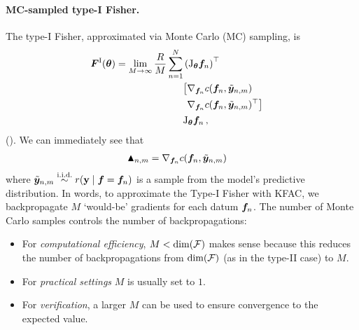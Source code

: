 \paragraph{MC-sampled type-I Fisher.}
The type-I Fisher, approximated via Monte Carlo (MC) sampling, is
\begin{align*}
  &\begin{aligned}
    {\bm{F}}^{\text{I}}({\bm{\theta}}) = \lim_{M \to \infty} \frac{R}{M} \sum_{n=1}^N
    &\left( \mathrm{J}_{{\bm{\theta}}} {\bm{f}}_n\right)^{\top} \\
    &
      \begin{aligned}
        \big[
        &\nabla_{{\bm{f}}_n} c({\bm{f}}_n, \tilde{{\bm{y}}}_{n,m}) \\
        &\nabla_{{\bm{f}}_n} c({\bm{f}}_n, \tilde{{\bm{y}}}_{n,m})^{\top}
          \big]
      \end{aligned} \\
    &\mathrm{J}_{{\bm{\theta}}} {\bm{f}}_n\,,
  \end{aligned}
\end{align*}
().
We can immediately see that
\begin{align*}
  \blacktriangle_{n,m}
  &= \nabla_{{\bm{f}}_n}  c({\bm{f}}_n, \tilde{{\bm{y}}}_{n,m})
\end{align*}
where $\tilde{\vy}_{n,m} \stackrel{\text{\iid}}{\sim} r(\rvy \mid \vf = \vf_n)$ is a sample from the model's predictive distribution.
In words, to approximate the Type-I Fisher with KFAC, we backpropagate $M$ `would-be' gradients for each datum ${\bm{f}}_n$.
The number of Monte Carlo samples controls the number of backpropagations:
\begin{itemize}
\item For \emph{computational efficiency}, $M<\dim({\mathcal{F}})$ makes sense because this reduces the number of backpropagations from $\dim({\mathcal{F}})$ (as in the type-II case) to $M$.
\item For \emph{practical settings} $M$ is usually set to $1$.
\item For \emph{verification}, a larger $M$ can be used to ensure convergence to the expected value.
\end{itemize}

